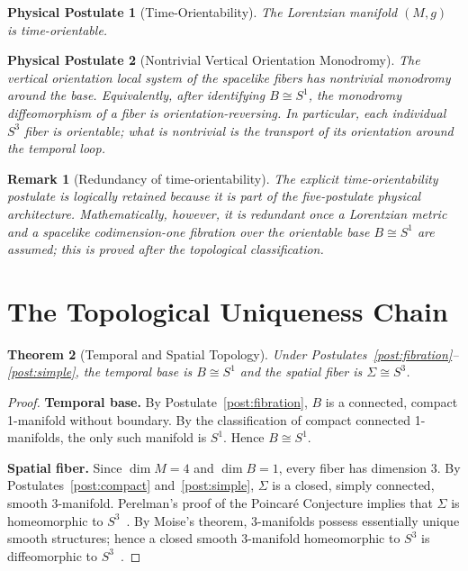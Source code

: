 \documentclass[11pt]{article}
\theoremstyle{canonmath}
\newtheorem{theorem}{Theorem}[section]
\newtheorem{remark}[theorem]{Remark}
\theoremstyle{canonpostulate}
\newtheorem{postulate}{Physical Postulate}[section]
\theoremstyle{canonproposition}
\providecommand{\M}{\mathcal{M}}
\providecommand{\Sone}{S^1}
\providecommand{\Sthree}{S^3}
\def\mathcal#1{#1}%
\begin{document}
\begin{postulate}[Time-Orientability] \label{post:timeorient}
The Lorentzian manifold $(\M,g)$ is time-orientable.
\end{postulate}

\begin{postulate}[Nontrivial Vertical Orientation Monodromy] \label{post:nonorient}
The vertical orientation local system of the spacelike fibers has nontrivial monodromy around the base. Equivalently, after identifying $B\cong\Sone$, the monodromy diffeomorphism of a fiber is orientation-reversing. In particular, each individual $\Sthree$ fiber is orientable; what is nontrivial is the transport of its orientation around the temporal loop.
\end{postulate}

\begin{remark}[Redundancy of time-orientability]
The explicit time-orientability postulate is logically retained because it is part of the five-postulate physical architecture. Mathematically, however, it is redundant once a Lorentzian metric and a spacelike codimension-one fibration over the orientable base $B\cong\Sone$ are assumed; this is proved after the topological classification.
\end{remark}

\section{The Topological Uniqueness Chain}

\begin{theorem}[Temporal and Spatial Topology] \label{thm:spatial}
Under Postulates~\ref{post:fibration}--\ref{post:simple}, the temporal base is $B\cong\Sone$ and the spatial fiber is $\Sigma\cong\Sthree$.
\end{theorem}
\begin{proof}
\textbf{Temporal base.} By Postulate~\ref{post:fibration}, $B$ is a connected, compact 1-manifold without boundary. By the classification of compact connected 1-manifolds, the only such manifold is $\Sone$. Hence $B\cong\Sone$.

\textbf{Spatial fiber.} Since $\dim\M=4$ and $\dim B=1$, every fiber has dimension 3. By Postulates~\ref{post:compact} and~\ref{post:simple}, $\Sigma$ is a closed, simply connected, smooth 3-manifold. Perelman's proof of the Poincar\'e Conjecture implies that $\Sigma$ is homeomorphic to $\Sthree$~\cite{perelman,perelmanSurgery,perelmanExtinction}. By Moise's theorem, 3-manifolds possess essentially unique smooth structures; hence a closed smooth 3-manifold homeomorphic to $\Sthree$ is diffeomorphic to $\Sthree$~\cite{moise}.
\end{proof}
\end{document}
